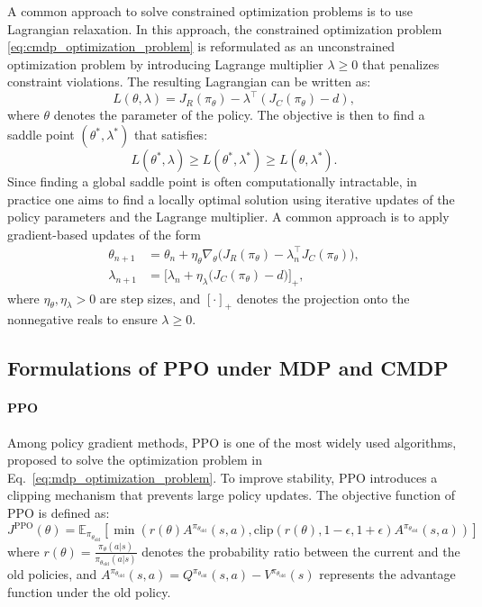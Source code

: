 A common approach to solve constrained optimization problems is to use Lagrangian relaxation.
In this approach, the constrained optimization problem \eqref{eq:cmdp_optimization_problem} is reformulated as an unconstrained optimization problem by introducing Lagrange multiplier $\lambda \geq 0$ that penalizes constraint violations.
The resulting Lagrangian can be written as:
\begin{equation}
    L(\theta, \lambda) = J_R(\pi_\theta) - \lambda^\top (J_C(\pi_\theta) - d),
\end{equation}
where $\theta$ denotes the parameter of the policy.
The objective is then to find a saddle point $(\theta^*, \lambda^*)$ that satisfies:
\begin{equation}
    L(\theta^*, \lambda) \geq L(\theta^*, \lambda^*) \geq L(\theta, \lambda^*).
\end{equation}
Since finding a global saddle point is often computationally intractable, in practice one aims to find a locally optimal solution using iterative updates of the policy parameters and the Lagrange multiplier. 
A common approach is to apply gradient-based updates of the form
\begin{align}
    \theta_{n+1} &= \theta_n + \eta_\theta \nabla_\theta \Big(J_R(\pi_\theta) - \lambda_n^\top J_C(\pi_\theta)\Big), \\
    \lambda_{n+1} &= \Big[ \lambda_n + \eta_\lambda \big( J_C(\pi_\theta) - d \big) \Big]_+,
\end{align}
where $\eta_\theta, \eta_\lambda > 0$ are step sizes, and $[\cdot]_+$ denotes the projection onto the nonnegative reals to ensure $\lambda \geq 0$.


\subsection{Formulations of PPO under MDP and CMDP}

\paragraph{\textbf{PPO}}

Among policy gradient methods, PPO is one of the most widely used algorithms, proposed to solve the optimization problem in Eq.~\ref{eq:mdp_optimization_problem}.
To improve stability, PPO introduces a clipping mechanism that prevents large policy updates.
The objective function of PPO is defined as:
\begin{equation} \label{eq:ppo_objective}
    J^{\text{PPO}}(\theta) = \mathbb{E}_{\pi_{\theta_\text{old}}} \left[ \min \left( r(\theta) A^{\pi_{\theta_\text{old}}}(s, a), \text{clip}(r(\theta), 1 - \epsilon, 1 + \epsilon) A^{\pi_{\theta_\text{old}}}(s, a) \right) \right]
\end{equation}
where $r(\theta) = \frac{\pi_\theta(a|s)}{\pi_{\theta_\text{old}}(a|s)}$ denotes the probability ratio between the current and the old policies, and $A^{\pi_{\theta_\text{old}}}(s, a) = Q^{\pi_{\theta_\text{old}}}(s, a) - V^{\pi_{\theta_\text{old}}}(s)$ represents the advantage function under the old policy.

